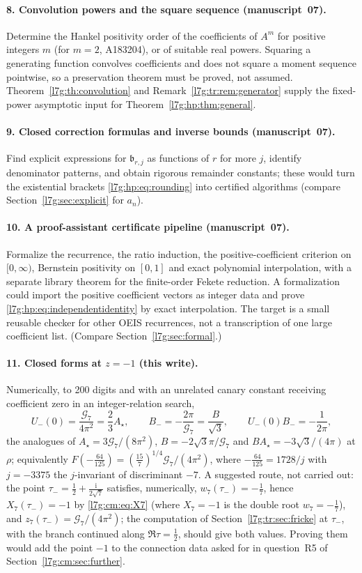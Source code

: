 \documentclass[11pt,letterpaper]{article}
\theoremstyle{remark}\newtheorem{remark}[theorem]{Remark}
\newcommand{\G}{\mathcal G_7}\newcommand{\Ast}{A_\star}
\newcommand{\ii}{\mathrm i}\newcommand{\ee}{\mathrm e}
\newcounter{l7gtrsavedeq}
\begin{document}
\paragraph{8. Convolution powers and the square sequence (manuscript~07).}
Determine the Hankel positivity order of the coefficients of $A^m$ for
positive integers $m$ (for $m=2$, A183204), or of suitable real powers.
Squaring a generating function convolves coefficients and does not square a
moment sequence pointwise, so a preservation theorem must be proved, not
assumed. Theorem~\ref{l7g:th:convolution} and
Remark~\ref{l7g:tr:rem:generator} supply the fixed-power asymptotic input
for Theorem~\ref{l7g:hp:thm:general}.

\paragraph{9. Closed correction formulas and inverse bounds (manuscript~07).}
Find explicit expressions for $\mathfrak b_{r,j}$ as functions of $r$ for
more $j$, identify denominator patterns, and obtain rigorous remainder
constants; these would turn the existential brackets
\eqref{l7g:hp:eq:rounding} into certified algorithms (compare
Section~\ref{l7g:sec:explicit} for $a_n$).

\paragraph{10. A proof-assistant certificate pipeline (manuscript~07).}
Formalize the recurrence, the ratio induction, the positive-coefficient
criterion on $[0,\infty)$, Bernstein positivity on $[0,1]$ and exact
polynomial interpolation, with a separate library theorem for the
finite-order Fekete reduction. A formalization could import the positive
coefficient vectors as integer data and prove
\eqref{l7g:hp:eq:independentidentity} by exact interpolation. The target is a
small reusable checker for other OEIS recurrences, not a transcription of
one large coefficient list. (Compare Section~\ref{l7g:sec:formal}.)

\paragraph{11. Closed forms at $z=-1$ (this write).}
Numerically, to 200 digits and with an unrelated canary constant receiving
coefficient zero in an integer-relation search,
\[
 U_-(0)=\frac{\G}{4\pi^2}=\frac23\Ast,\qquad
 B_-=-\frac{2\pi}{\G}=\frac{B}{\sqrt3},\qquad
 U_-(0)B_-=-\frac1{2\pi},
\]
the analogues of $\Ast=3\G/(8\pi^2)$, $B=-2\sqrt3\pi/\G$ and
$B\Ast=-3\sqrt3/(4\pi)$ at $\rho$; equivalently
$F(-\frac{64}{125})=(\frac{15}7)^{1/4}\G/(4\pi^2)$, where
$-\frac{64}{125}=1728/j$ with $j=-3375$ the $j$-invariant of discriminant
$-7$. A suggested route, not carried out: the point
$\tau_-=\frac12+\frac{\ii}{2\sqrt7}$ satisfies, numerically,
$w_7(\tau_-)=-\frac17$, hence $X_7(\tau_-)=-1$ by \eqref{l7g:cm:eq:X7}
(where $X_7=-1$ is the double root $w_7=-\frac17$), and
$z_7(\tau_-)=\G/(4\pi^2)$; the computation of
Section~\ref{l7g:tr:sec:fricke} at $\tau_-$, with the branch continued along
$\Re\tau=\frac12$, should give both values. Proving them would add the
point $-1$ to the connection data asked for in question~R5 of
Section~\ref{l7g:cm:sec:further}.
\end{document}
